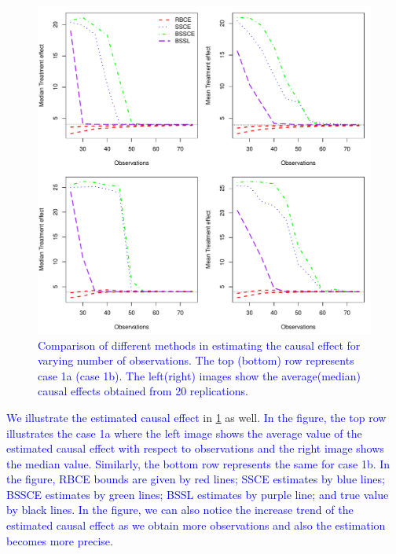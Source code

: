 \documentclass[preprint,12pt]{elsarticle}
\newcommand{\added}[1]{\textcolor{blue}{#1}}
\begin{document}
\begin{figure}[h]
	\centering
	\includegraphics[width = 0.9\linewidth]{treat_obs_rev.pdf}
	\caption{\added{Comparison of different methods in estimating the causal effect for varying number of observations. The top (bottom) row represents case 1a (case 1b). The left(right) images show the average(median) causal effects obtained from 20 replications. }}
	\label{fig:comp:trt}
\end{figure}

\added{We illustrate the estimated causal effect} in \cref{fig:comp:trt} as well. \added{In the figure, the top row
illustrates the case 1a where the left image shows the average value of the estimated
causal effect with respect to observations and the right image
shows the median value. Similarly, the
bottom row represents the same for case 1b. In the figure, RBCE bounds are given by red lines; SSCE estimates by blue lines; BSSCE estimates by green lines; BSSL estimates by purple line; and true value by black lines. In the figure, we can also notice the increase trend of the estimated causal effect as we obtain more observations and also the estimation becomes more precise.}
\end{document}
